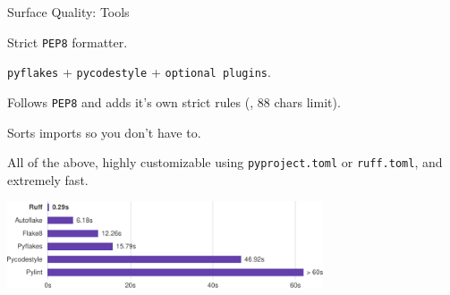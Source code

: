 \begin{frame}{Surface Quality: Tools}
  \large
  \begin{description}
    \setlength{\itemsep}{1em}
    \item [\iref{https://pycodestyle.pycqa.org/en/latest/}{pycodestyle}] Strict \texttt{PEP8} formatter.
    \item [\iref{https://flake8.pycqa.org/en/latest/}{flake8}] \texttt{pyflakes} + \texttt{pycodestyle} + \texttt{optional plugins}.
    \item [\iref{https://black.readthedocs.io/en/stable/}{black}] Follows \texttt{PEP8} and adds it's
      own strict rules (\eg, 88 chars limit).
    \item [\iref{https://pycqa.github.io/isort/}{isort}] Sorts imports so you don't have to.
    \item [\iref{https://docs.astral.sh/ruff/}{Ruff}] All of the above, highly customizable using
      \texttt{pyproject.toml} or \texttt{ruff.toml}, and extremely fast.
  \end{description}
  \vspace{0.5cm}
  \begin{center}
    \includegraphics[width=0.7\textwidth]{graphics/speed_ruff.pdf}
  \end{center}
\end{frame}

